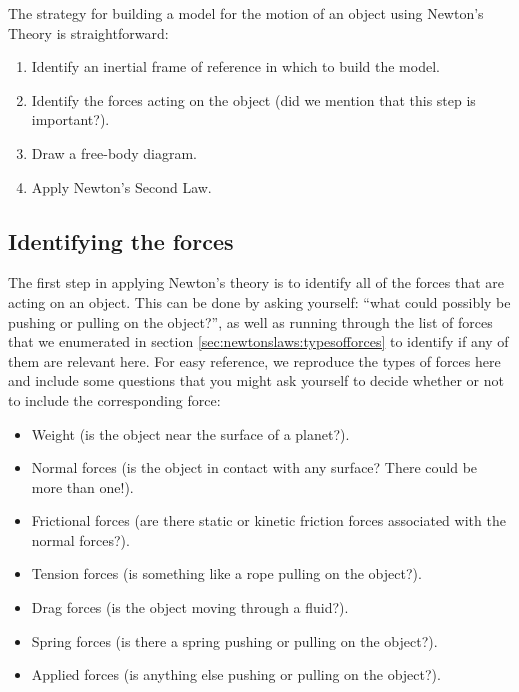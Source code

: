 The strategy for building a model for the motion of an object using Newton's Theory is straightforward:
\begin{enumerate}
\item Identify an inertial frame of reference in which to build the model.
\item Identify the forces acting on the object (did we mention that this step is important?).
\item Draw a free-body diagram.
\item Apply Newton's Second Law.
\end{enumerate}

\subsection{Identifying the forces}
The first step in applying Newton's theory is to identify all of the forces that are acting on an object. This can be done by asking yourself: ``what could possibly be pushing or pulling on the object?'', as well as running through the list of forces that we enumerated in section \ref{sec:newtonslaws:typesofforces} to identify if any of them are relevant here. For easy reference, we reproduce the types of forces here and include some questions that you might ask yourself to decide whether or not to include the corresponding force:
\begin{itemize}
\item Weight (is the object near the surface of a planet?).
\item Normal forces (is the object in contact with any surface? There could be more than one!).
\item Frictional forces (are there static or kinetic friction forces associated with the normal forces?).
\item Tension forces (is something like a rope pulling on the object?).
\item Drag forces (is the object moving through a fluid?).
\item Spring forces (is there a spring pushing or pulling on the object?).
\item Applied forces (is anything else pushing or pulling on the object?).
\end{itemize}
\newpage
